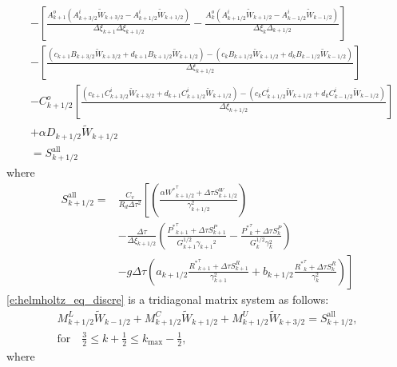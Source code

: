 \begin{align}
&- \left[
    \frac{A^o_{k+1}\left(A^i_{k+3/2}\tilde{W}_{k+3/2}
                    -    A^i_{k+1/2}\tilde{W}_{k+1/2}\right)}
         {\Delta\xi_{k+1}\Delta\xi_{k+1/2}}
   - \frac{A^o_k\left(A^i_{k+1/2}\tilde{W}_{k+1/2}
                -    A^i_{k-1/2}\tilde{W}_{k-1/2} \right)}
         {\Delta\xi_k\Delta_{k+1/2}}
   \right] \nonumber \\
&- \left[
    \frac{\left( c_{k+1} B_{k+3/2}\tilde{W}_{k+3/2}
               + d_{k+1} B_{k+1/2}\tilde{W}_{k+1/2} \right)
    -     \left( c_k B_{k+1/2}\tilde{W}_{k+1/2}
           +     d_k B_{k-1/2}\tilde{W}_{k-1/2} \right)
    }
    {\Delta\xi_{k+1/2}}
  \right] \nonumber \\
&- C^o_{k+1/2} \left[ \frac{\left(c_{k+1} C^i_{k+3/2} \tilde{W}_{k+3/2}
                               + d_{k+1} C^i_{k+1/2} \tilde{W}_{k+1/2}\right)
                         - \left(c_k C^i_{k+1/2}\tilde{W}_{k+1/2}
                               + d_k C^i_{k-1/2}\tilde{W}_{k-1/2}   \right)  }
                         {\Delta \xi_{k+1/2}}\right] \nonumber \\
&+ \alpha D_{k+1/2} \tilde{W}_{k+1/2} \nonumber \\
&= S^{\text{all}}_{k+1/2}
\label{e:helmholtz_eq_discre}
\end{align}
%
where
%
\begin{align}
 S^\text{all}_{k+1/2}
= & \frac{C_v}{R_d \Delta \tau^2}
\left[
 \left(
  \frac{\alpha {W^*}^{\tau}_{k+1/2} + \Delta \tau S^W_{k+1/2}}
       {\gamma_{k+1/2}^2}
 \right)\right. \nonumber\\
&  - \frac{\Delta \tau}{\Delta \xi_{k+1/2}}
\left.
 \left(
  \frac{{P^*}^\tau_{k+1}+\Delta\tau S^P_{k+1}}{G^{1/2}_{k+1}
       {\gamma_{k+1}}^2}
 -\frac{{P^*}^\tau_k + \Delta\tau S^P_k}
       {G^{1/2}_k \gamma_k^2}
 \right)\right. \nonumber\\
&  - g\Delta\tau
\left.
  \left(
   a_{k+1/2}\frac{{R^*}^\tau_{k+1}+\Delta\tau S^R_{k+1}}{\gamma_{k+1}^2}
+  b_{k+1/2}\frac{{R^*}_k^\tau + \Delta\tau S^R_k}{\gamma_k^2}
  \right)
\right]
\end{align}
%
\autoref{e:helmholtz_eq_discre} is a tridiagonal matrix system as follows:
%
\begin{equation}
 \begin{gathered}
  M^L_{k+1/2}\tilde{W}_{k-1/2}
+ M^C_{k+1/2}\tilde{W}_{k+1/2}
+ M^U_{k+1/2}\tilde{W}_{k+3/2}
= S^\text{all}_{k+1/2}, \\
\text{for}  \quad \frac{3}{2} \leq k+\frac{1}{2} \leq k_\text{max} -\frac{1}{2},
 \end{gathered}
\end{equation}
%
where
%


